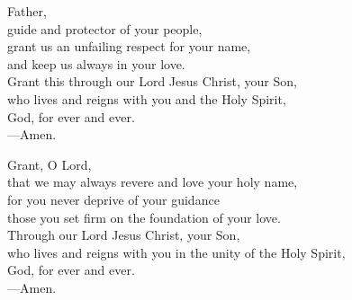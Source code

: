 \prayer


\begin{prayerverse}
Father,\\
guide and protector of your people,\\
grant us an unfailing respect for your name,\\
and keep us always in your love.\\
Grant this through our Lord Jesus Christ, your Son,\\
who lives and reigns with you and the Holy Spirit,\\
God, for ever and ever.\\
{\color{red}---\thinspace}Amen.
\end{prayerverse}


\begin{prayerverse}
Grant, O Lord,\\
that we may always revere and love your holy name,\\
for you never deprive of your guidance\\
those you set firm on the foundation of your love.\\
Through our Lord Jesus Christ, your Son,\\
who lives and reigns with you in the unity of the Holy Spirit,\\
God, for ever and ever.\\
{\color{red}---\thinspace}Amen.
\end{prayerverse}


